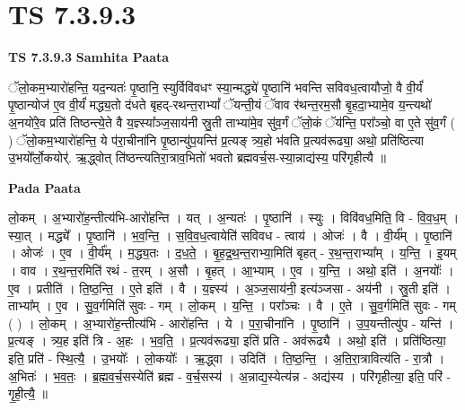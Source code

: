 \documentclass[17pt]{extarticle}
\begin{document}
\section*{ TS 7.3.9.3 }

\textbf{TS 7.3.9.3 } \newline
\textbf{Samhita Paata} \newline

ॅलो॒कम॒भ्यारो॑हन्ति॒ यद॒न्यतः॑ पृ॒ष्ठानि॒ स्युर्विवि॑वधꣳ स्या॒न्मद्ध्ये॑ पृ॒ष्ठानि॑ भवन्ति सविवध॒त्वायौजो॒ वै वी॒र्यं॑ पृ॒ष्ठान्योज॑ ए॒व वी॒र्यं॑ मद्ध्य॒तो द॑धते बृहद्-रथन्त॒राभ्यां᳚ ॅयन्ती॒यं ॅवाव र॑थन्त॒रम॒सौ बृ॒हदा॒भ्यामे॒व य॒न्त्यथो॑ अ॒नयो॑रे॒व प्रति॑ तिष्ठन्त्ये॒ते वै य॒ज्ञ्स्या᳚ञ्ज॒साय॑नी स्रु॒ती ताभ्या॑मे॒व सु॑व॒र्गं ॅलो॒कं ॅय॑न्ति॒ परा᳚ञ्चो॒ वा ए॒ते सु॑व॒र्गं ( ) ॅलो॒कम॒भ्यारो॑हन्ति॒ ये प॑रा॒चीना॑नि पृ॒ष्ठान्यु॑प॒यन्ति॑ प्र॒त्यङ् त्र्य॒हो भ॑वति प्र॒त्यव॑रूढ्या॒ अथो॒ प्रति॑ष्ठित्या उ॒भयो᳚र्लो॒कयोर्॑. ऋ॒द्ध्वोत् ति॑ष्ठन्त्यतिरा॒त्राव॒भितो॑ भवतो ब्रह्मवर्च॒स-स्या॒न्नाद्य॑स्य॒ परि॑गृहीत्यै ॥ \newline

\textbf{Pada Paata} \newline

लो॒कम् । अ॒भ्यारो॑ह॒न्तीत्य॑भि-आरो॑हन्ति । यत् । अ॒न्यतः॑ । पृ॒ष्ठानि॑ । स्युः । विवि॑वध॒मिति॒ वि - वि॒व॒ध॒म् । स्या॒त् । मद्ध्ये᳚ । पृ॒ष्ठानि॑ । भ॒व॒न्ति॒ । स॒वि॒व॒ध॒त्वायेति॑ सविवध - त्वाय॑ । ओजः॑ । वै । वी॒र्य᳚म् । पृ॒ष्ठानि॑ । ओजः॑ । ए॒व । वी॒र्य᳚म् । म॒द्ध्य॒तः । द॒ध॒ते॒ । बृ॒ह॒द्र॒थ॒न्त॒राभ्या॒मिति॑ बृहत् - र॒थ॒न्त॒राभ्या᳚म् । य॒न्ति॒ । इ॒यम् । वाव । र॒थ॒न्त॒रमिति॑ रथं - त॒रम् । अ॒सौ । बृ॒हत् । आ॒भ्याम् । ए॒व । य॒न्ति॒ । अथो॒ इति॑ । अ॒नयोः᳚ । ए॒व । प्रतीति॑ । ति॒ष्ठ॒न्ति॒ । ए॒ते इति॑ । वै । य॒ज्ञ्स्य॑ । अ॒ञ्ज॒साय॑नी॒ इत्य॑ञ्जसा - अय॑नी । स्रु॒ती इति॑ । ताभ्या᳚म् । ए॒व । सु॒व॒र्गमिति॑ सुवः - गम् । लो॒कम् । य॒न्ति॒ । परा᳚ञ्चः । वै । ए॒ते । सु॒व॒र्गमिति॑ सुवः - गम् ( ) । लो॒कम् । अ॒भ्यारो॑ह॒न्तीत्य॑भि - आरो॑हन्ति । ये । प॒रा॒चीना॑नि । पृ॒ष्ठानि॑ । उ॒प॒यन्तीत्यु॑प - यन्ति॑ । प्र॒त्यङ् । त्र्य॒ह इति॑ त्रि - अ॒हः । भ॒व॒ति॒ । प्र॒त्यव॑रूढ्या॒ इति॑ प्रति - अव॑रूढ्यै । अथो॒ इति॑ । प्रति॑ष्ठित्या॒ इति॒ प्रति॑ - स्थि॒त्यै॒ । उ॒भयोः᳚ । लो॒कयोः᳚ । ऋ॒द्ध्वा । उदिति॑ । ति॒ष्ठ॒न्ति॒ । अ॒ति॒रा॒त्रावित्य॑ति - रा॒त्रौ । अ॒भितः॑ । भ॒व॒तः॒ । ब्र॒ह्म॒व॒र्च॒सस्येति॑ ब्रह्म - व॒र्च॒सस्य॑ । अ॒न्नाद्य॒स्येत्य॑न्न - अद्य॑स्य । परि॑गृहीत्या॒ इति॒ परि॑ - गृ॒ही॒त्यै॒ ॥  \newline
\end{document}
